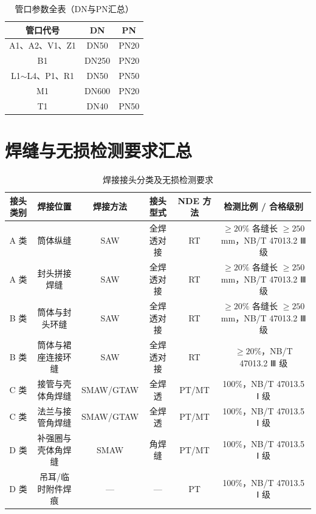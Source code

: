 \begin{table}[htbp]
  \centering
  \caption{管口参数全表（DN与PN汇总）}
  \label{tab:cad-nozzle-summary}
  \small\renewcommand{\arraystretch}{1.35}
  \setlength{\tabcolsep}{12pt}
  \begin{tabularx}{0.7\textwidth}{@{}c c c@{}}
    \toprule
    \textbf{管口代号} & \textbf{DN} & \textbf{PN} \\
    \midrule
    A1、A2、V1、Z1    & DN50  & PN20 \\
    B1                & DN250 & PN20 \\
    L1$\sim$L4、P1、R1 & DN50  & PN50 \\
    M1                & DN600 & PN20 \\
    T1                & DN40  & PN50 \\
    \bottomrule
  \end{tabularx}
\end{table}

\section{焊缝与无损检测要求汇总}
\label{sec:cad-welds}

\begin{table}[htbp]
  \centering
  \caption{焊接接头分类及无损检测要求}
  \label{tab:cad-weld-nde}
  \small\renewcommand{\arraystretch}{1.2}
  \setlength{\tabcolsep}{5pt}
  \begin{tabularx}{\textwidth}{@{}c c c c c c@{}}
    \toprule
    \textbf{接头类别} & \textbf{焊接位置} & \textbf{焊接方法} & \textbf{接头型式} & \textbf{NDE 方法} & \textbf{检测比例 / 合格级别} \\
    \midrule
    A 类 & 筒体纵缝                      & SAW & 全焊透对接 & RT & $\ge 20\%$ 各缝长 $\ge 250$ mm，NB/T 47013.2 Ⅲ 级 \\
    A 类 & 封头拼接焊缝                  & SAW & 全焊透对接 & RT & $\ge 20\%$ 各缝长 $\ge 250$ mm，NB/T 47013.2 Ⅲ 级 \\
    B 类 & 筒体与封头环缝                & SAW & 全焊透对接 & RT & $\ge 20\%$ 各缝长 $\ge 250$ mm，NB/T 47013.2 Ⅲ 级 \\
    B 类 & 筒体与裙座连接环缝            & SAW & 全焊透对接 & RT & $\ge 20\%$，NB/T 47013.2 Ⅲ 级 \\
    C 类 & 接管与壳体角焊缝              & SMAW/GTAW & 全焊透 & PT/MT & 100\%，NB/T 47013.5 Ⅰ 级 \\
    C 类 & 法兰与接管角焊缝              & SMAW/GTAW & 全焊透 & PT/MT & 100\%，NB/T 47013.5 Ⅰ 级 \\
    D 类 & 补强圈与壳体角焊缝            & SMAW & 角焊缝 & PT/MT & 100\%，NB/T 47013.5 Ⅰ 级 \\
    D 类 & 吊耳/临时附件焊痕             & —     & —     & PT      & 100\%，NB/T 47013.5 Ⅰ 级 \\
    \bottomrule
  \end{tabularx}
\end{table}

